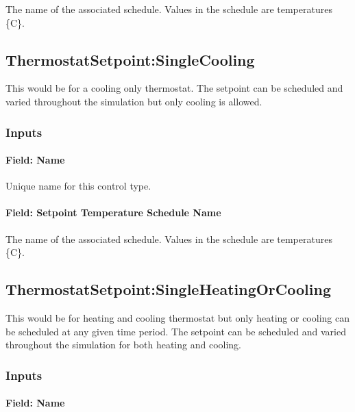 The name of the associated schedule. Values in the schedule are temperatures \{C\}.

\subsection{ThermostatSetpoint:SingleCooling}\label{thermostatsetpointsinglecooling}

This would be for a cooling only thermostat. The setpoint can be scheduled and varied throughout the simulation but only cooling is allowed.

\subsubsection{Inputs}\label{inputs-2-047}

\paragraph{Field: Name}\label{field-name-2-044}

Unique name for this control type.

\paragraph{Field: Setpoint Temperature Schedule Name}\label{field-setpoint-temperature-schedule-name-1-000}

The name of the associated schedule. Values in the schedule are temperatures \{C\}.

\subsection{ThermostatSetpoint:SingleHeatingOrCooling}\label{thermostatsetpointsingleheatingorcooling}

This would be for heating and cooling thermostat but only heating or cooling can be scheduled at any given time period. The setpoint can be scheduled and varied throughout the simulation for both heating and cooling.

\subsubsection{Inputs}\label{inputs-3-042}

\paragraph{Field: Name}\label{field-name-3-038}

